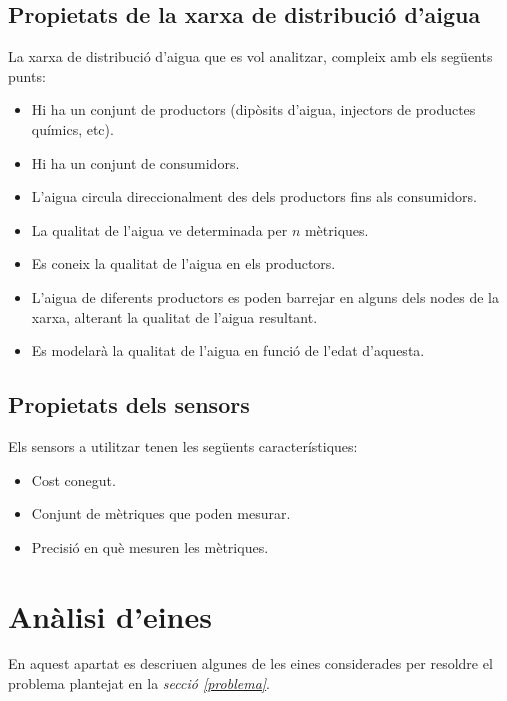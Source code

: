 \documentclass[12pt]{article}
\begin{document}
\subsection{Propietats de la xarxa de distribució d'aigua}
La xarxa de distribució d'aigua que es vol analitzar, compleix amb els següents punts:
\begin{itemize}
	\item Hi ha un conjunt de productors (dipòsits d'aigua, injectors de productes químics, etc).
	\item Hi ha un conjunt de consumidors.
	\item L'aigua circula direccionalment des dels productors fins als consumidors.
	\item La qualitat de l'aigua ve determinada per $n$ mètriques.
	\item Es coneix la qualitat de l'aigua en els productors.
	\item L'aigua de diferents productors es poden barrejar en alguns dels nodes de la xarxa, alterant la qualitat de l'aigua resultant. 
	\item Es modelarà la qualitat de l'aigua en funció de l'edat d'aquesta.
\end{itemize}

\subsection{Propietats dels sensors}
Els sensors a utilitzar tenen les següents característiques:
\begin{itemize}
	\item Cost conegut.
	\item Conjunt de mètriques que poden mesurar.
	\item Precisió en què mesuren les mètriques.
\end{itemize}


\clearpage
\section{Anàlisi d'eines}
En aquest apartat es descriuen algunes de les eines considerades per resoldre el problema plantejat en la \textit{secció \ref{problema}}.
\end{document}

